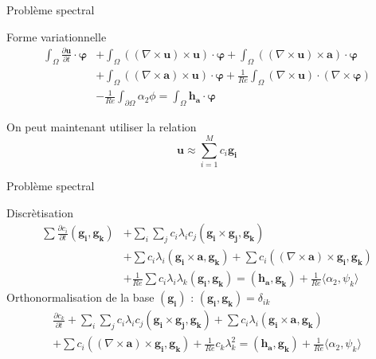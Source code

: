 \documentclass{beamer}
\newcommand{\rot}{{\nabla\times}}
\begin{document}
\begin{frame}{Problème spectral}
\begin{block}{Forme variationnelle}
\begin{align*}
\int_\Omega \frac{\partial \mathbf{u}}{\partial t}\cdot \bm{\varphi} &+ \int_\Omega ((\rot \mathbf{u})\times \mathbf{u})\cdot \bm{\varphi} + \int_\Omega ((\rot \mathbf{u})\times \mathbf{a})\cdot\bm{\varphi} \\
&+ \int_\Omega ((\rot \mathbf{a})\times \mathbf{u})\cdot\bm{\varphi} + \frac{1}{Re}\int_\Omega (\rot \mathbf{u})\cdot(\rot\bm{\varphi}) \\
&-\frac{1}{Re}\int_{\partial\Omega} \alpha_2\phi = \int_\Omega \mathbf{h_a}\cdot\bm{\varphi}
\end{align*}
\end{block}
On peut maintenant utiliser la relation 
\[ \mathbf{u}\approx\sum_{i=1}^M c_i\mathbf{g_i} \]
\end{frame}

\begin{frame}{Problème spectral}
\begin{block}{Discrètisation}
\begin{align*}
\sum \frac{\partial c_i}{\partial t}(\mathbf{g_i},\mathbf{g_k}) &+ \sum_i\sum_j c_i\lambda_i c_j(\mathbf{g_i}\times \mathbf{g_j}, \mathbf{g_k}) \\
&+ \sum c_i\lambda_i(\mathbf{g_i}\times \mathbf{a},\mathbf{g_k}) + \sum c_i((\rot \mathbf{a})\times \mathbf{g_i}, \mathbf{g_k}) \\
&+ \frac{1}{Re}\sum c_i\lambda_i\lambda_k(\mathbf{g_i},\mathbf{g_k}) = (\mathbf{h_a},\mathbf{g_k}) + \frac{1}{Re}\langle\alpha_2,\psi_k\rangle
\end{align*}
Orthonormalisation de la base $(\mathbf{g_i})$ : $(\mathbf{g_i},\mathbf{g_k})=\delta_{ik}$
\begin{eqnarray*}
\frac{\partial c_k}{\partial t} + \sum_i\sum_j c_i\lambda_i c_j(\mathbf{g_i}\times \mathbf{g_j}, \mathbf{g_k}) + \sum c_i\lambda_i(\mathbf{g_i}\times \mathbf{a},\mathbf{g_k})\\
+ \sum c_i((\rot \mathbf{a})\times \mathbf{g_i}, \mathbf{g_k}) + \frac{1}{Re}c_k\lambda_k^2 = (\mathbf{h_a},\mathbf{g_k}) + \frac{1}{Re}\langle\alpha_2,\psi_k\rangle
\end{eqnarray*}
\end{block}
\end{frame}
\end{document}
